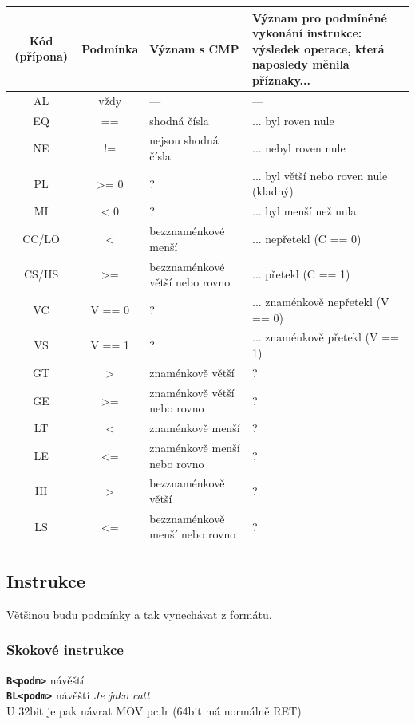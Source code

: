 \documentclass[
]{cz_sablona}
\newcommand{\instr}[1]{\texttt{\textbf{#1}}}
\begin{document}
\begin{table}[H]
\centering
\small
\begin{tabular}{|c|c|p{5.2cm}|p{6.2cm}|}
\hline
\textbf{Kód (přípona)} & \textbf{Podmínka} & \textbf{Význam s CMP} & \textbf{Význam pro podmíněné vykonání instrukce: výsledek operace, která naposledy měnila příznaky...} \\
\hline
AL & vždy & --- & --- \\
\hline
EQ & == & shodná čísla & ... byl roven nule \\
\hline
NE & != & nejsou shodná čísla & ... nebyl roven nule \\
\hline
PL & >= 0 & ? & ... byl větší nebo roven nule (kladný) \\
\hline
MI & < 0 & ? & ... byl menší než nula \\
\hline
CC/LO & < & bezznaménkové menší & ... nepřetekl (C == 0) \\
\hline
CS/HS & >= & bezznaménkové větší nebo rovno & ... přetekl (C == 1) \\
\hline
VC & V == 0 & ? & ... znaménkově nepřetekl (V == 0) \\
\hline
VS & V == 1 & ? & ... znaménkově přetekl (V == 1) \\
\hline
GT & > & znaménkově větší & ? \\
\hline
GE & >= & znaménkově větší nebo rovno & ? \\
\hline
LT & < & znaménkově menší & ? \\
\hline
LE & <= & znaménkově menší nebo rovno & ? \\
\hline
HI & > & bezznaménkově větší & ? \\
\hline
LS & <= & bezznaménkově menší nebo rovno & ? \\
\hline
\end{tabular}
\end{table}

\subsection{Instrukce}
Většinou budu podmínky a tak vynechávat z formátu.
\subsubsection{Skokové instrukce}
\instr{B<podm>} návěští\\
\instr{BL<podm>} návěští \textit{Je jako call}\\
U 32bit je pak návrat MOV pc,lr (64bit má normálně RET)\\
\end{document}
